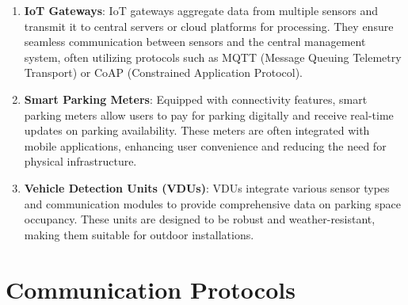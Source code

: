 \documentclass[oneside, 12pt, a4paper, draft]{book}
\begin{document}
\begin{enumerate}
\begin{enumerate}
\item \textbf{IoT Gateways}: IoT gateways aggregate data from multiple sensors and transmit it to central servers or cloud platforms for processing. They ensure seamless communication between sensors and the central management system, often utilizing protocols such as MQTT (Message Queuing Telemetry Transport) or CoAP (Constrained Application Protocol).

\item \textbf{Smart Parking Meters}: Equipped with connectivity features, smart parking meters allow users to pay for parking digitally and receive real-time updates on parking availability. These meters are often integrated with mobile applications, enhancing user convenience and reducing the need for physical infrastructure.

\item \textbf{Vehicle Detection Units (VDUs)}: VDUs integrate various sensor types and communication modules to provide comprehensive data on parking space occupancy. These units are designed to be robust and weather-resistant, making them suitable for outdoor installations.
\end{enumerate}
\end{enumerate}
\section{Communication Protocols}
\label{sec:org749711b}
\end{document}
